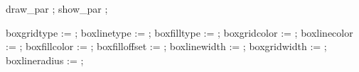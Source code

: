   draw_par ; \iftracepositions show_par ; \fi
\stopuseMPgraphic

   boxgridtype   :=  ;
   boxlinetype   :=  ;
   boxfilltype   :=  ;
   boxgridcolor  :=  ;
   boxlinecolor  :=  ;
   boxfillcolor  :=  ;
   boxfilloffset :=  ;
   boxlinewidth  :=  ;
   boxgridwidth  :=  ;
   boxlineradius :=  ;
\stopuseMPgraphic



\ifx\parcounter\undefined \newcounter\parcounter \fi

\def\MPself   {\MPvar{self}}
\def\MPbself  {b:\MPself}
\def\MPeself  {e:\MPself}
\def\MPwself  {w:\MPself}
\def\paranchor{p:\parcounter}



